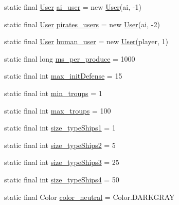 \begin{DoxyCompactItemize}
\item 
static final \hyperlink{classfr_1_1projet_1_1groupe40_1_1client_1_1_user}{User} \hyperlink{classfr_1_1projet_1_1groupe40_1_1util_1_1_constantes_a8445e21423d9e557d2cbdc37c99513ff}{ai\+\_\+user} = new \hyperlink{classfr_1_1projet_1_1groupe40_1_1client_1_1_user}{User}(ai, -\/1)
\item 
static final \hyperlink{classfr_1_1projet_1_1groupe40_1_1client_1_1_user}{User} \hyperlink{classfr_1_1projet_1_1groupe40_1_1util_1_1_constantes_a001dfc71bd19cf0985429b82bb445d7e}{pirates\+\_\+users} = new \hyperlink{classfr_1_1projet_1_1groupe40_1_1client_1_1_user}{User}(ai, -\/2)
\item 
static final \hyperlink{classfr_1_1projet_1_1groupe40_1_1client_1_1_user}{User} \hyperlink{classfr_1_1projet_1_1groupe40_1_1util_1_1_constantes_a44ea036556abe89e534f3fcb0ec18d73}{human\+\_\+user} = new \hyperlink{classfr_1_1projet_1_1groupe40_1_1client_1_1_user}{User}(player, 1)
\item 
static final long \hyperlink{classfr_1_1projet_1_1groupe40_1_1util_1_1_constantes_a4f2cf3e303ab9b072eb4611e55d054da}{ms\+\_\+per\+\_\+produce} = 1000
\item 
static final int \hyperlink{classfr_1_1projet_1_1groupe40_1_1util_1_1_constantes_a2bd65c5ef73d280d9f14b9ca2473d8f8}{max\+\_\+init\+Defense} = 15
\item 
static final int \hyperlink{classfr_1_1projet_1_1groupe40_1_1util_1_1_constantes_af4d6e6400edafa97c91c3f57aa734838}{min\+\_\+troups} = 1
\item 
static final int \hyperlink{classfr_1_1projet_1_1groupe40_1_1util_1_1_constantes_aba9d3c74d98acb0c7a8ee168ebae374d}{max\+\_\+troups} = 100
\item 
static final int \hyperlink{classfr_1_1projet_1_1groupe40_1_1util_1_1_constantes_ae0a76cc37f0fdb2ab7514c78f8c503dd}{size\+\_\+type\+Ships1} = 1
\item 
static final int \hyperlink{classfr_1_1projet_1_1groupe40_1_1util_1_1_constantes_a927632963a2d010a87055adaf0863633}{size\+\_\+type\+Ships2} = 5
\item 
static final int \hyperlink{classfr_1_1projet_1_1groupe40_1_1util_1_1_constantes_a1e26fc3e365203f88414786ce1741b57}{size\+\_\+type\+Ships3} = 25
\item 
static final int \hyperlink{classfr_1_1projet_1_1groupe40_1_1util_1_1_constantes_aced2a1f3350a1de856c19af6d8cbc518}{size\+\_\+type\+Ships4} = 50
\item 
static final Color \hyperlink{classfr_1_1projet_1_1groupe40_1_1util_1_1_constantes_ad5e5cffc8588cb22d0283158b1b349ee}{color\+\_\+neutral} = Color.\+D\+A\+R\+K\+G\+R\+AY

\end{DoxyCompactItemize}

